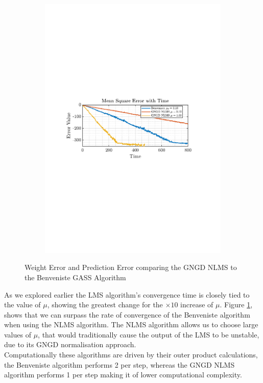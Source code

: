 \documentclass[12pt]{article}
\numberwithin{equation}{section}
\begin{document}
\begin{figure}[H]
\begin{subfigure}{0.49\textwidth}
					\includegraphics[trim={2.2cm 11.2cm 3.15cm  11.2cm}, clip, width=\textwidth]{../MATLAB/figures/q2_2c_fig04.pdf} 
					\captionsetup{justification=centering}
				\end{subfigure}
				\captionsetup{justification=centering}
				\caption{Weight Error and Prediction Error comparing the GNGD NLMS to the Benveniste GASS Algorithm}
				\label{fig: 2-2c}
			\end{figure}
		
			As we explored earlier the LMS algorithm's convergence time is closely tied to the value of $\mu$, showing the greatest change for the $\times10$ increase of $\mu$. Figure \ref{fig: 2-2c}, shows that we can surpass the rate of convergence of the Benveniste algorithm when using the NLMS algorithm. The NLMS algorithm allows us to choose large values of $\mu$, that would traditionally cause the output of the LMS to be unstable, due to its GNGD normalisation approach. \\
			Computationally these algorithms are driven by their outer product calculations, the Benveniste algorithm performs 2 per step, whereas the GNGD NLMS algorithm performs 1 per step making it of lower computational complexity.
			
\end{document}
